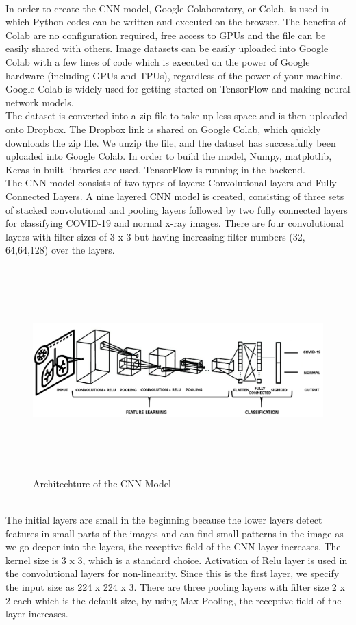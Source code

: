 \documentclass[12pt]{revtex4}
\begin{document}
\\In order to create the CNN model, Google Colaboratory, or Colab, is used in which Python codes can be written and executed on the browser. The benefits of Colab are no configuration required, free access to GPUs and the file can be easily shared with others. Image datasets can be easily uploaded into Google Colab with a few lines of code which is executed on the power of Google hardware (including GPUs and TPUs), regardless of the power of your machine. Google Colab is widely used for getting started on TensorFlow and making neural network models. 
\\The dataset is converted into a zip file to take up less space and is then uploaded onto Dropbox. The Dropbox link is shared on Google Colab, which quickly downloads the zip file. We unzip the file, and the dataset has successfully been uploaded into Google Colab. In order to build the model, Numpy, matplotlib, Keras in-built libraries are used. TensorFlow is running in the backend. 
\\The CNN model consists of two types of layers: Convolutional layers and Fully Connected Layers. A nine layered CNN model is created, consisting of three sets of stacked convolutional and pooling layers followed by two fully connected layers for classifying COVID-19 and normal x-ray images. There are four convolutional layers with filter sizes of 3 x 3 but having increasing filter numbers (32, 64,64,128) over the layers. 
\begin{figure}[htp]
    \centering
    \includegraphics[width=16cm, height = 8cm]{CNN_Arch.png}
    \caption{Architechture of the CNN Model}
    \label{fig:ghi}
\end{figure}
\\The initial layers are small in the beginning because the lower layers detect features in small parts of the images and can find small patterns in the image as we go deeper into the layers, the receptive field of the CNN layer increases. The kernel size is 3 x 3, which is a standard choice. Activation of Relu layer is used in the convolutional layers for non-linearity. Since this is the first layer, we specify the input size as 224 x 224 x 3. There are three pooling layers with filter size 2 x 2 each which is the default size, by using Max Pooling, the receptive field of the layer increases.
\end{document}
